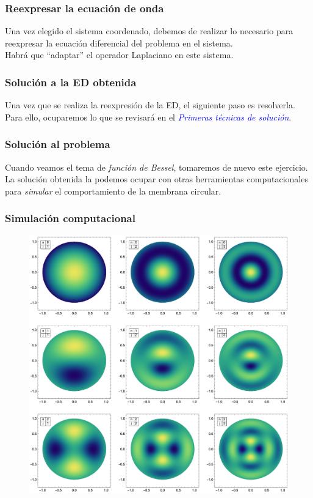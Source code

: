 \documentclass[12pt]{beamer}
\begin{document}
\begin{frame}
\frametitle{Reexpresar la ecuación de onda}
Una vez elegido el sistema coordenado, debemos de realizar lo necesario para reexpresar la ecuación diferencial del problema en el sistema.
\\
\bigskip
\pause
Habrá que \enquote{adaptar} el operador Laplaciano en este sistema.
\end{frame}
\begin{frame}
\frametitle{Solución a la ED obtenida}
Una vez que se realiza la reexpresión de la ED, el siguiente paso es resolverla.
\\
\bigskip
\pause
Para ello, ocuparemos lo que se revisará en el \emph{\textcolor{blue}{Primeras técnicas de solución}}.
\end{frame}
\begin{frame}
\frametitle{Solución al problema}
Cuando veamos el tema de \emph{función de Bessel}, tomaremos de nuevo este ejercicio.
\\
\bigskip
\pause
La solución obtenida la podemos ocupar con otras herramientas computacionales para \emph{simular} el comportamiento de la membrana circular.
\end{frame}
\begin{frame}
\frametitle{Simulación computacional}
\begin{figure}[h!]
    \centering
    \includegraphics[scale=0.32]{Imagenes/Modos_Vibracion_Membrana_Circular_01.eps}
\end{figure}
\end{frame}
\end{document}
